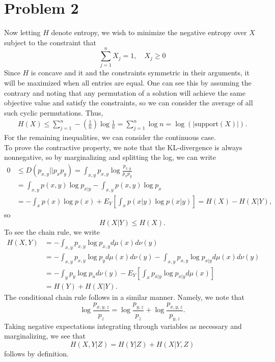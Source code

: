 \documentclass{article}
\begin{document}
\section{Problem 2}
Now letting $H$ denote entropy, we wish to minimize the negative entropy over $X$ subject to the constraint that 
\[
\sum_{j=1}^nX_j=1,\quad X_j\geq0
\]
Since $H$ is concave and it and the constraints symmetric in their arguments, it will be maximized when all entries are equal. One can see this by assuming the contrary and noting that any permutation of a solution will achieve the same objective value and satisfy the constraints, so we can consider the average of all such cyclic permutations. Thus,
\begin{align*}
H(X)\leq\sum_{j=1}^{n}-\left(\frac{1}{n}\right)\log\frac{1}{n}=\sum_{j=1}^{n}\log n=\log(|\text{support}(X)|).
\end{align*}
For the remaining inequalities, we can consider the continuous case. \\
To prove the contractive property, we note that the KL-divergence is always nonnegative, so by marginalizing and splitting the log, we can write
\begin{align*}
0&\leq D(p_{x,y}||p_xp_y)=\int_{x,y}p_{x,y}\log\frac{p_{x,y}}{p_xp_y}\\&=\int_{x,y}p(x,y)\log p_{x|y}-\int_{x,y}p(x,y)\log p_x\\&=
-\int_{x}p(x)\log p(x)+E_Y\left[\int_{x}p(x|y)\log p(x|y)\right]=H(X)-H(X|Y),
\end{align*}
so
\[
H(X|Y)\leq H(X).
\] 
To see the chain rule, we write
\begin{align*}
H(X,Y)&=-\int_{x,y}p_{x,y}\log p_{x,y}d\mu(x)d\nu(y)\\&=
-\int_{x,y}p_{x,y}\log p_yd\mu(x)d\nu(y)-\int_{x,y}p_{x,y}\log p_{x|y}d\mu(x)d\nu(y)\\&=
-\int_{y}p_y\log p_ud\nu(y)-E_Y\left[\int_{x}p_{x|y}\log p_{x|y}d\mu(x)\right]\\&=
H(Y)+H(X|Y).
\end{align*}
The conditional chain rule follows in a similar manner. Namely, we note that 
\[
\log\frac{p_{x,y,z}}{p_z}=\log\frac{p_{y,z}}{p_z}+\log\frac{p_{x,y,z}}{p_{y,z}}.
\]
Taking negative expectations integrating through variables as necessary and marginalizing, we see that 
\[
H(X,Y|Z)=H(Y|Z)+H(X|Y,Z)
\]
follows by definition. 
\end{document}
